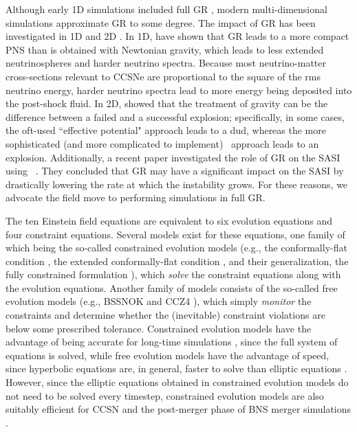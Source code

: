 Although early 1D simulations included full GR
\citep[e.g.,][]{mw1966}, modern multi-dimensional simulations approximate
GR to some degree.
The impact of GR has been investigated in 1D \citep{bdm2001,lmm2012}
and 2D \citep{mjm2012,oc2018}.
In 1D, \citet{bdm2001} have shown that GR leads to a more compact PNS than is
obtained with Newtonian gravity, which leads to less extended neutrinospheres
and harder neutrino spectra.
Because most neutrino-matter cross-sections relevant to CCSNe are proportional to
the square of the rms neutrino energy, harder neutrino spectra lead to more
energy being deposited into the post-shock fluid.
In 2D, \citet{mjm2012} showed that the treatment of gravity
can be the difference between a failed and a successful explosion;
specifically, in some cases, the oft-used
``effective potential" approach \citep{mdj2006} leads to a dud, whereas
the more sophisticated (and more complicated to implement) \xcfc\ approach
leads to an explosion.
Additionally, a recent paper investigated the role of GR on the SASI
using \thornado\ \citep{dem2024}.
They concluded that GR may have a significant impact on the SASI by drastically
lowering the rate at which the instability grows.
For these reasons, we advocate the field move to performing simulations
in full GR.

The ten Einstein field equations are equivalent to six evolution equations and
four constraint equations.
Several models exist for these equations, one family of which being the
so-called constrained evolution models
(e.g., the conformally-flat condition \citep{wmm1996},
the extended conformally-flat condition \citep{ccd2009},
and their generalization, the fully constrained formulation \citep{bgg2004}),
which \emph{solve} the constraint equations along with the evolution equations.
Another family of models consists of the so-called free evolution
models (e.g., BSSNOK \citep{nok1987,sn1995,bs1998} and CCZ4 \citep{blp2003}),
which simply \emph{monitor} the constraints and determine whether the
(inevitable) constraint violations are below some prescribed tolerance.
Constrained evolution models have the advantage of being accurate for long-time
simulations \citep{br2017},
since the full system of equations is solved, while free evolution
models have the advantage of speed, since hyperbolic equations are, in general,
faster to solve than elliptic equations \citep{rz2013}.
However, since the elliptic equations obtained in constrained evolution models
do not need to be solved every timestep, constrained evolution models are also
suitably efficient for CCSN and the post-merger phase of BNS merger simulations
\citep[e.g., see][]{hjm2023}.

